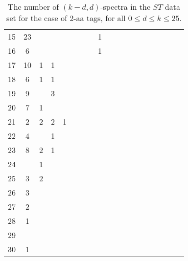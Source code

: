 \documentclass{article}
\begin{document}
\begin{table}[h]
{\begin{tabular}{|c|c|
c|c|c|c|c|c|c|c|c|c|c|c|c|c|c|c|c|}
15  & 23 &  &  &  &  &  &  & 1 &  &  &  &  &  &  &  &  &  & \\

16  & 6 &  &  &  &  &  &  & 1 &  &  &  &  &  &  &  &  &  & \\

17  & 10 & 1 & 1 &  &  &  &  &  &  &  &  &  &  &  &  &  &  & \\

18  & 6 & 1 & 1 &  &  &  &  &  &  &  &  &  &  &  &  &  &  & \\

19  & 9 &  & 3 &  &  &  &  &  &  &  &  &  &  &  &  &  &  & \\

20  & 7 & 1 &  &  &  &  &  &  &  &  &  &  &  &  &  &  &  & \\

21  & 2 & 2 & 2 & 1 &  &  &  &  &  &  &  &  &  &  &  &  &  & \\

22  & 4 &  & 1 &  &  &  &  &  &  &  &  &  &  &  &  &  &  & \\

23  & 8 & 2 & 1 &  &  &  &  &  &  &  &  &  &  &  &  &  &  & \\

24  &  & 1 &  &  &  &  &  &  &  &  &  &  &  &  &  &  &  & \\

25  & 3 & 2 &  &  &  &  &  &  &  &  &  &  &  &  &  &  &  & \\

26  & 3 &  &  &  &  &  &  &  &  &  &  &  &  &  &  &  &  & \\

27  & 2 &  &  &  &  &  &  &  &  &  &  &  &  &  &  &  &  & \\

28  & 1 &  &  &  &  &  &  &  &  &  &  &  &  &  &  &  &  & \\

29  &  &  &  &  &  &  &  &  &  &  &  &  &  &  &  &  &  & \\

30  & 1 &  &  &  &  &  &  &  &  &  &  &  &  &  &  &  &  & \\

  \hline
\end{tabular}
\par}
\centering
\caption{The number of $(k-d,d)$-spectra in the $ST$ data set for the case of 2-aa tags, for all $0\le d\le k\le 25$.}
\vspace{3mm}
\label{table:kd-1-ST}
\end{table}
\end{document}
